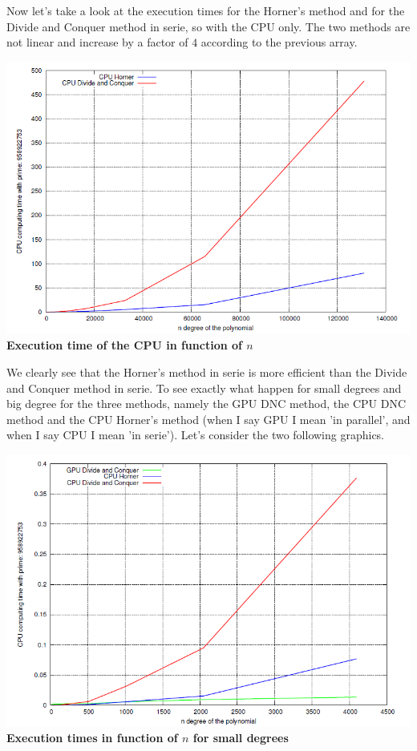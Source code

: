 Now let's take a look at the execution times for the Horner's method and for the Divide and Conquer method in serie, so with the CPU only. The two methods are not linear and increase by a factor of $4$ according to the previous array.\\

\begin{center}
\includegraphics[scale=0.8]{eps/CPUtime_n.png}
\textbf{Execution time of the CPU in function of $n$}\\
\end{center}

We clearly see that the Horner's method in serie is more efficient than the Divide and Conquer method in serie. To see exactly what happen for small degrees and big degree for the three methods, namely the GPU DNC method, the CPU DNC method and the CPU Horner's method (when I say GPU I mean 'in parallel', and when I say CPU I mean 'in serie'). Let's consider the two following graphics.\\

\begin{center}
\includegraphics[scale=0.8]{eps/time_small_n.png}
\textbf{Execution times in function of $n$ for small degrees}\\
\end{center}

